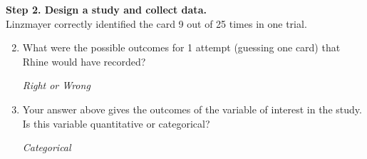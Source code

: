 {\bf Step 2. Design a study and collect data.}\\
 Linzmayer correctly identified the card 9 out of 25 times in one
 trial.\vspace{-.3cm}
 \begin{enumerate}
   \setcounter{enumi}{1}
   \item  What were the possible outcomes for 1 attempt (guessing one card)
     that Rhine would have recorded?
\begin{students}
  \vspace{1cm}
\end{students}

\begin{key}
{\it Right or Wrong}
\end{key}

\item Your answer above gives the outcomes of the variable of interest
  in the study.  Is this variable quantitative or categorical?
\begin{students}
  \vspace{1cm}
\end{students}

\begin{key}
{\it Categorical}
\end{key}
  
   \end{enumerate}
   
